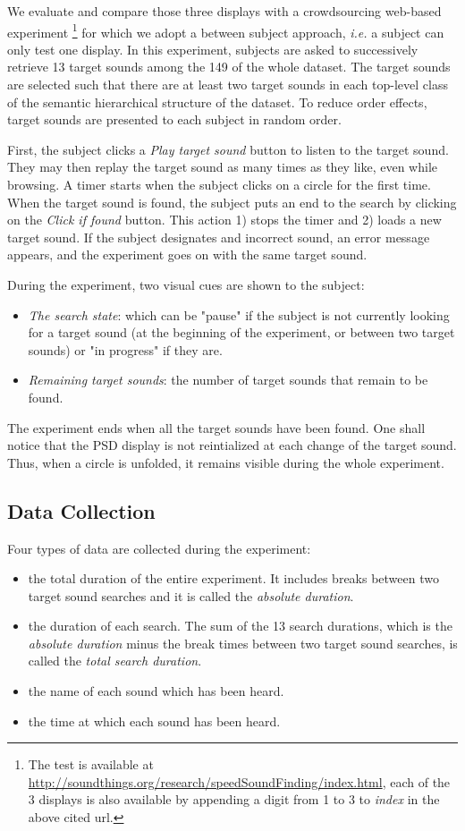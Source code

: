 \documentclass{aes2e}
\begin{document}
We evaluate and compare those three displays with a crowdsourcing web-based experiment \footnote{The test is available at \url{http://soundthings.org/research/speedSoundFinding/index.html}, each of the 3 displays is also available by appending a digit from 1 to 3 to \textit{index} in the above cited url.} for which we adopt a between subject approach, \textit{i.e.} a subject can only test one display. In this experiment, subjects are asked to successively retrieve 13 target sounds among the 149 of the whole dataset. The target sounds are selected such that there are at least two target sounds in each top-level class of the semantic hierarchical structure of the dataset. To reduce order effects, target sounds are presented to each subject in random order.

First, the subject clicks a \textit{Play target sound} button to listen to the target sound. They may then replay the target sound as many times as they like, even while browsing. A timer starts when the subject clicks on a circle for the first time. When the target sound is found, the subject puts an end to the search by clicking on the \textit{Click if found} button. This action 1) stops the timer and 2) loads a new target sound. If the subject designates and incorrect sound, an error message appears, and the experiment goes on with the same target sound.

During the experiment, two visual cues are shown to the subject:
\begin{itemize}
\item \textit{The search state}: which can be "pause" if the subject is not currently looking for a target sound (at the beginning of the experiment, or between two target sounds) or  "in progress"  if they are.
\item \textit{Remaining target sounds}: the number of target sounds that remain to be found.
\end{itemize}

The experiment ends when all the target sounds have been found. One shall notice that the PSD display is not reintialized at each change of the target sound. Thus, when a circle is unfolded, it remains visible during the whole experiment.

\subsection{Data Collection}
Four types of data are collected during the experiment:
\begin{itemize}
\item the total duration of the entire experiment. It includes breaks between two target sound searches and it is called the \textit{absolute duration}.
\item the duration of each search. The sum of the 13 search durations, which is the \textit{absolute duration} minus the break times between two target sound searches, is called the \textit{total search duration}.
\item the name of each sound which has been heard.
\item the time at which each sound has been heard.  
\end{itemize}
\end{document}

